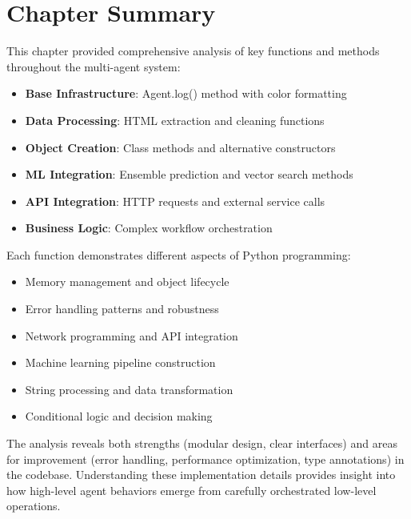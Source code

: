 \section{Chapter Summary}

This chapter provided comprehensive analysis of key functions and methods throughout the multi-agent system:

\begin{itemize}
\item \textbf{Base Infrastructure}: Agent.log() method with color formatting
\item \textbf{Data Processing}: HTML extraction and cleaning functions
\item \textbf{Object Creation}: Class methods and alternative constructors
\item \textbf{ML Integration}: Ensemble prediction and vector search methods
\item \textbf{API Integration}: HTTP requests and external service calls
\item \textbf{Business Logic}: Complex workflow orchestration
\end{itemize}

Each function demonstrates different aspects of Python programming:
\begin{itemize}
\item Memory management and object lifecycle
\item Error handling patterns and robustness
\item Network programming and API integration
\item Machine learning pipeline construction
\item String processing and data transformation
\item Conditional logic and decision making
\end{itemize}

The analysis reveals both strengths (modular design, clear interfaces) and areas for improvement (error handling, performance optimization, type annotations) in the codebase. Understanding these implementation details provides insight into how high-level agent behaviors emerge from carefully orchestrated low-level operations.